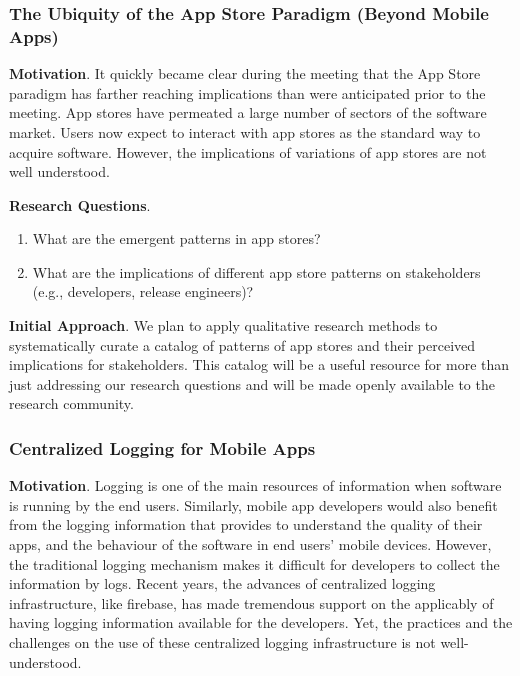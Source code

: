 \documentclass[a4paper]{article}
\newcommand{\smallsection}[1]{\noindent \textbf{#1}. }
\begin{document}
\subsubsection{The Ubiquity of the App Store Paradigm (Beyond Mobile Apps)}

\smallsection{Motivation}
It quickly became clear during the meeting that the App Store paradigm has farther reaching implications than were anticipated prior to the meeting.
App stores have permeated a large number of sectors of the software market.
Users now expect to interact with app stores as the standard way to acquire software.
However, the implications of variations of app stores are not well understood.

\vspace{2mm}
\smallsection{Research Questions}

\begin{enumerate}[\bfseries RQ1]
	\item What are the emergent patterns in app stores?
	\item What are the implications of different app store patterns on stakeholders (e.g., developers, release engineers)?
\end{enumerate}

\smallsection{Initial Approach}
We plan to apply qualitative research methods to systematically curate a catalog of patterns of app stores and their perceived implications for stakeholders. This catalog will be a useful resource for more than just addressing our research questions and will be made openly available to the research community.

\subsubsection{Centralized Logging for Mobile Apps}

\smallsection{Motivation}
Logging is one of the main resources of information when software is running by the end users. Similarly, mobile app developers would also benefit from the logging information that provides to understand the quality of their apps, and the behaviour of the software in end users' mobile devices. However, the traditional logging mechanism makes it difficult for developers to collect the information by logs. Recent years, the advances of centralized logging infrastructure, like firebase, has made tremendous support on the applicably of having logging information available for the developers. Yet, the practices and the challenges on the use of these centralized logging infrastructure is not well-understood. 
\end{document}
